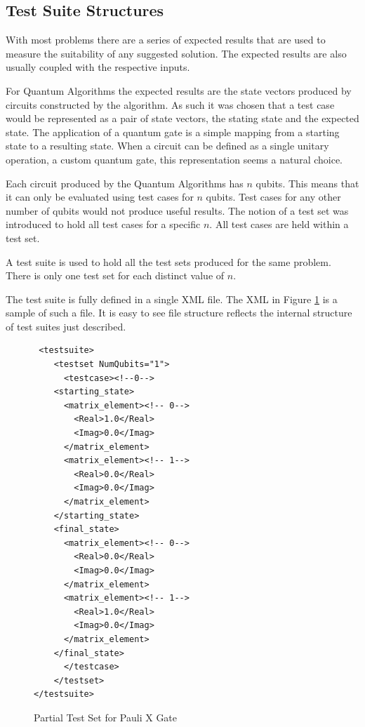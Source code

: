 \documentclass[authoryearcitations]{UoYCSproject}
\begin{document}
\subsection{Test Suite Structures}
\label{sec:testsuitestruc}
With most problems there are a series of expected results that are used to measure the suitability of any suggested solution.
The expected results are also usually coupled with the respective inputs.

For Quantum Algorithms the expected results are the state vectors produced by circuits constructed by the algorithm.
As such it was chosen that a test case would be represented as a pair of state vectors, the stating state and the expected state.
The application of a quantum gate is a simple mapping from a starting state to a resulting state.
When a circuit can be defined as a single unitary operation, a custom quantum gate, this representation seems a natural choice.

Each circuit produced by the Quantum Algorithms has $n$ qubits.
This means that it can only be evaluated using test cases for $n$ qubits.
Test cases for any other number of qubits would not produce useful results.
The notion of a test set was introduced to hold all test cases for a specific $n$.
All test cases are held within a test set.

A test suite is used to hold all the test sets produced for the same problem.
There is only one test set for each distinct value of $n$.

The test suite is fully defined in a single XML file.
The XML in Figure \ref{code:paulixtestset} is a sample of such a file.
It is easy to see file structure reflects the internal structure of test suites just described.

\lstset{language = XML}
\begin{figure}
 \begin{lstlisting}
 <testsuite>
    <testset NumQubits="1">
      <testcase><!--0-->
	<starting_state>
	  <matrix_element><!-- 0-->
	    <Real>1.0</Real>
	    <Imag>0.0</Imag>
	  </matrix_element>
	  <matrix_element><!-- 1-->
	    <Real>0.0</Real>
	    <Imag>0.0</Imag>
	  </matrix_element>
	</starting_state>
	<final_state>
	  <matrix_element><!-- 0-->
	    <Real>0.0</Real>
	    <Imag>0.0</Imag>
	  </matrix_element>
	  <matrix_element><!-- 1-->
	    <Real>1.0</Real>
	    <Imag>0.0</Imag>
	  </matrix_element>
	</final_state>
      </testcase>
    </testset>
</testsuite>
 \end{lstlisting}
\label{code:paulixtestset}
\caption{Partial Test Set for Pauli X Gate}
\end{figure}
\end{document}
